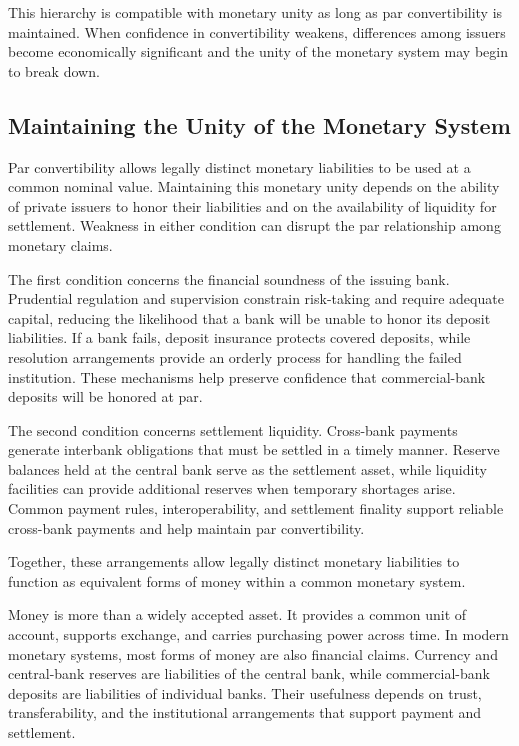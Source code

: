 This hierarchy is compatible with monetary unity as long as par convertibility is maintained. When confidence in convertibility weakens, differences among issuers become economically significant and the unity of the monetary system may begin to break down.

\subsection{Maintaining the Unity of the Monetary System}

Par convertibility allows legally distinct monetary liabilities to be used at a common nominal value. Maintaining this monetary unity depends on the ability of private issuers to honor their liabilities and on the availability of liquidity for settlement. Weakness in either condition can disrupt the par relationship among monetary claims.

The first condition concerns the financial soundness of the issuing bank. Prudential regulation and supervision constrain risk-taking and require adequate capital, reducing the likelihood that a bank will be unable to honor its deposit liabilities. If a bank fails, deposit insurance protects covered deposits, while resolution arrangements provide an orderly process for handling the failed institution. These mechanisms help preserve confidence that commercial-bank deposits will be honored at par.

The second condition concerns settlement liquidity. Cross-bank payments generate interbank obligations that must be settled in a timely manner. Reserve balances held at the central bank serve as the settlement asset, while liquidity facilities can provide additional reserves when temporary shortages arise. Common payment rules, interoperability, and settlement finality support reliable cross-bank payments and help maintain par convertibility.

Together, these arrangements allow legally distinct monetary liabilities to function as equivalent forms of money within a common monetary system.



Money is more than a widely accepted asset. It provides a common unit of account, supports exchange, and carries purchasing power across time. In modern monetary systems, most forms of money are also financial claims. Currency and central-bank reserves are liabilities of the central bank, while commercial-bank deposits are liabilities of individual banks. Their usefulness depends on trust, transferability, and the institutional arrangements that support payment and settlement.

